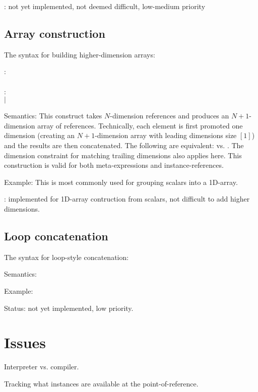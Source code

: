 : not yet implemented, not deemed difficult, low-medium priority

\subsection{Array construction}
\label{sec:arrays:aggregate:construction}

The syntax for building higher-dimension arrays:

\medskip
\noindent
{} : \ttt{\{}  \ttt{\}}\\
\\
:  \ttt{,} \\
$|$ 
\medskip

Semantics:
This construct takes $N$-dimension references and produces an 
$N+1$-dimension array of references.  
Technically, each element is first promoted one dimension
(creating an $N+1$-dimension array with leading dimensions size $[1]$)
and the results are then concatenated.  
The following are equivalent:  vs. .
The dimension constraint for matching trailing dimensions also applies here.  
This construction is valid for both meta-expressions and instance-references.  

Example:
This is most commonly used for grouping scalars into a 1D-array.  

: implemented for 1D-array contruction from scalars, 
	not difficult to add higher dimensions.  

\subsection{Loop concatenation}
\label{sec:arrays:aggregate:loopcat}

The syntax for loop-style concatenation:

\medskip
\noindent
\ttt{( \# :}  \ttt{:}  \ttt{:}
	 \ttt{)}
\medskip

Semantics:

Example:

Status: not yet implemented, low priority.

\section{Issues}
\label{sec:arrays:issues}

Interpreter vs. compiler.

Tracking what instances are available at the point-of-reference.  

